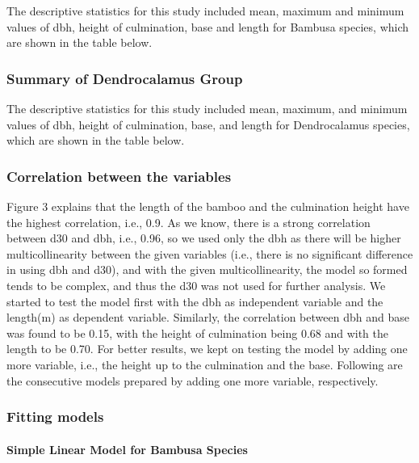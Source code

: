 \documentclass[preprint, 3p,
authoryear]{elsarticle} %
\begin{document}
The descriptive statistics for this study included mean, maximum and
minimum values of dbh, height of culmination, base and length for
Bambusa species, which are shown in the table below.

\hypertarget{summary-of-dendrocalamus-group}{%
\subsubsection{Summary of Dendrocalamus
Group}\label{summary-of-dendrocalamus-group}}

The descriptive statistics for this study included mean, maximum, and
minimum values of dbh, height of culmination, base, and length for
Dendrocalamus species, which are shown in the table below.

\hypertarget{correlation-between-the-variables}{%
\subsubsection{Correlation between the
variables}\label{correlation-between-the-variables}}

Figure 3 explains that the length of the bamboo and the culmination
height have the highest correlation, i.e., 0.9. As we know, there is a
strong correlation between d30 and dbh, i.e., 0.96, so we used only the
dbh as there will be higher multicollinearity between the given
variables (i.e., there is no significant difference in using dbh and
d30), and with the given multicollinearity, the model so formed tends to
be complex, and thus the d30 was not used for further analysis. We
started to test the model first with the dbh as independent variable and
the length(m) as dependent variable. Similarly, the correlation between
dbh and base was found to be 0.15, with the height of culmination being
0.68 and with the length to be 0.70. For better results, we kept on
testing the model by adding one more variable, i.e., the height up to
the culmination and the base. Following are the consecutive models
prepared by adding one more variable, respectively.

\hypertarget{fitting-models}{%
\subsubsection{Fitting models}\label{fitting-models}}

\hypertarget{simple-linear-model-for-bambusa-species}{%
\paragraph{Simple Linear Model for Bambusa
Species}\label{simple-linear-model-for-bambusa-species}}
\end{document}
